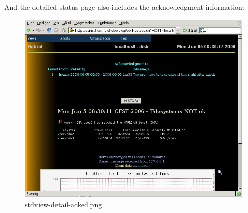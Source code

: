  And the detailed status page also includes the acknowledgment
 information: 

\begin{figure} 
\centering \caption{stdview-detail-acked.png}
\label{stdview-detail-acked.png}
\includegraphics[scale=0.5]{./stdview-detail-acked.png} 
\end{figure}

